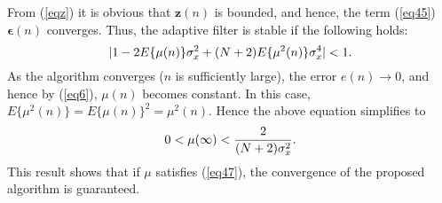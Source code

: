 \vspace{-0.5cm}
\par
\noindent From (\ref{eqz}) it is obvious that $\textbf{z}(n)$ is bounded, and hence, the term (\ref{eq45}) $\boldsymbol\epsilon(n)$ converges. Thus, the adaptive filter is stable if the following holds:
\vspace{-0.1cm}
\begin{equation}
|1-2E\{\mu(n)\}\sigma^2_x+(N+2)E\{\mu^2(n)\}\sigma^4_x|<1. \label{eq46}\vspace{-0.1cm}
\end{equation}
\noindent As the algorithm converges ($n$ is sufficiently large), the error $e(n)\rightarrow0$, and hence by (\ref{eq6}), $\mu(n)$ becomes constant. In this case,  $E\{\mu^2(n)\}=E\{\mu(n)\}^2=\mu^2(n)$. Hence the above equation simplifies to
\vspace{-0.1cm}
\begin{equation}
 0<\mu(\infty)<\frac{2}{(N+2)\sigma^2_x}. \label{eq47}\vspace{-0.1cm}
\end{equation}
\noindent This result shows that if $\mu$ satisfies (\ref{eq47}), the convergence of the proposed algorithm is guaranteed.




